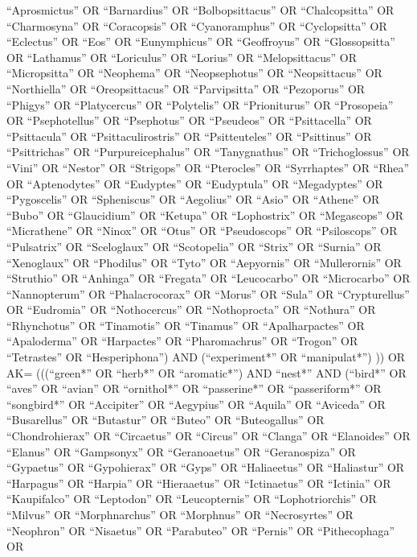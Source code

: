 \documentclass[
  number,
  review,
  onecolumn]{elsarticle}
\begin{document}
``Aprosmictus'' OR ``Barnardius'' OR ``Bolbopsittacus'' OR
``Chalcopsitta'' OR ``Charmosyna'' OR ``Coracopsis'' OR ``Cyanoramphus''
OR ``Cyclopsitta'' OR ``Eclectus'' OR ``Eos'' OR ``Eunymphicus'' OR
``Geoffroyus'' OR ``Glossopsitta'' OR ``Lathamus'' OR ``Loriculus'' OR
``Lorius'' OR ``Melopsittacus'' OR ``Micropsitta'' OR ``Neophema'' OR
``Neopsephotus'' OR ``Neopsittacus'' OR ``Northiella'' OR
``Oreopsittacus'' OR ``Parvipsitta'' OR ``Pezoporus'' OR ``Phigys'' OR
``Platycercus'' OR ``Polytelis'' OR ``Prioniturus'' OR ``Prosopeia'' OR
``Psephotellus'' OR ``Psephotus'' OR ``Pseudeos'' OR ``Psittacella'' OR
``Psittacula'' OR ``Psittaculirostris'' OR ``Psitteuteles'' OR
``Psittinus'' OR ``Psittrichas'' OR ``Purpureicephalus'' OR
``Tanygnathus'' OR ``Trichoglossus'' OR ``Vini'' OR ``Nestor'' OR
``Strigops'' OR ``Pterocles'' OR ``Syrrhaptes'' OR ``Rhea'' OR
``Aptenodytes'' OR ``Eudyptes'' OR ``Eudyptula'' OR ``Megadyptes'' OR
``Pygoscelis'' OR ``Spheniscus'' OR ``Aegolius'' OR ``Asio'' OR
``Athene'' OR ``Bubo'' OR ``Glaucidium'' OR ``Ketupa'' OR ``Lophostrix''
OR ``Megascops'' OR ``Micrathene'' OR ``Ninox'' OR ``Otus'' OR
``Pseudoscops'' OR ``Psiloscops'' OR ``Pulsatrix'' OR ``Sceloglaux'' OR
``Scotopelia'' OR ``Strix'' OR ``Surnia'' OR ``Xenoglaux'' OR
``Phodilus'' OR ``Tyto'' OR ``Aepyornis'' OR ``Mullerornis'' OR
``Struthio'' OR ``Anhinga'' OR ``Fregata'' OR ``Leucocarbo'' OR
``Microcarbo'' OR ``Nannopterum'' OR ``Phalacrocorax'' OR ``Morus'' OR
``Sula'' OR ``Crypturellus'' OR ``Eudromia'' OR ``Nothocercus'' OR
``Nothoprocta'' OR ``Nothura'' OR ``Rhynchotus'' OR ``Tinamotis'' OR
``Tinamus'' OR ``Apalharpactes'' OR ``Apaloderma'' OR ``Harpactes'' OR
``Pharomachrus'' OR ``Trogon'' OR ``Tetrastes'' OR ``Hesperiphona'') AND
(``experiment*'' OR ``manipulat*'') )) OR AK= (((``green*'' OR ``herb*''
OR ``aromatic*'') AND ``nest*'' AND (``bird*'' OR ``aves'' OR ``avian''
OR ``ornithol*'' OR ``passerine*'' OR ``passeriform*'' OR ``songbird*''
OR ``Accipiter'' OR ``Aegypius'' OR ``Aquila'' OR ``Aviceda'' OR
``Busarellus'' OR ``Butastur'' OR ``Buteo'' OR ``Buteogallus'' OR
``Chondrohierax'' OR ``Circaetus'' OR ``Circus'' OR ``Clanga'' OR
``Elanoides'' OR ``Elanus'' OR ``Gampsonyx'' OR ``Geranoaetus'' OR
``Geranospiza'' OR ``Gypaetus'' OR ``Gypohierax'' OR ``Gyps'' OR
``Haliaeetus'' OR ``Haliastur'' OR ``Harpagus'' OR ``Harpia'' OR
``Hieraaetus'' OR ``Ictinaetus'' OR ``Ictinia'' OR ``Kaupifalco'' OR
``Leptodon'' OR ``Leucopternis'' OR ``Lophotriorchis'' OR ``Milvus'' OR
``Morphnarchus'' OR ``Morphnus'' OR ``Necrosyrtes'' OR ``Neophron'' OR
``Nisaetus'' OR ``Parabuteo'' OR ``Pernis'' OR ``Pithecophaga'' OR
\end{document}
